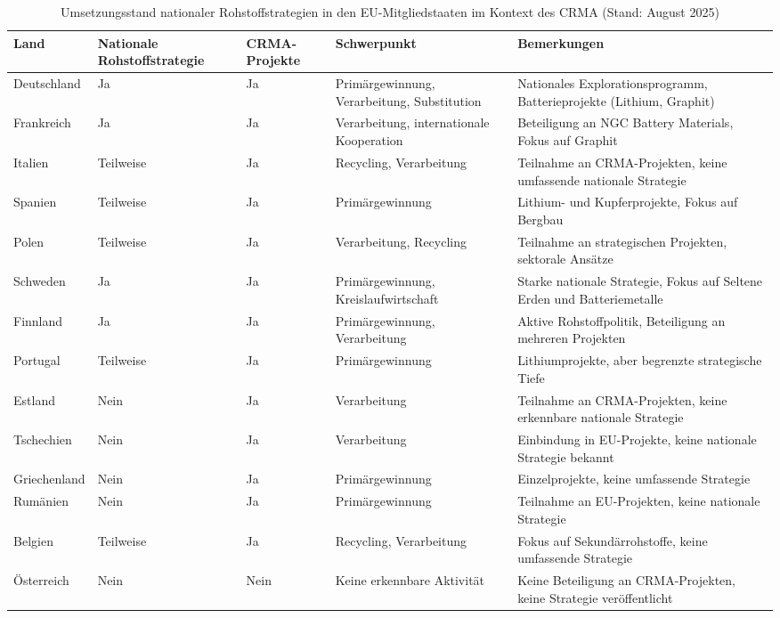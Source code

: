 \documentclass[12pt,a4paper,oneside]{book} %
\begin{document}
\begin{table}[htbp]
	\centering
	\caption{Umsetzungsstand nationaler Rohstoffstrategien in den EU-Mitgliedstaaten im Kontext des CRMA (Stand: August 2025)}
	\begin{tabular}{|p{3cm}|p{2.5cm}|p{2.5cm}|p{4cm}|p{6cm}|}
		\hline
		\textbf{Land} & \textbf{Nationale Rohstoffstrategie} & \textbf{CRMA-Projekte} & \textbf{Schwerpunkt} & \textbf{Bemerkungen} \\
		\hline
		Deutschland & Ja & Ja & Primärgewinnung, Verarbeitung, Substitution & Nationales Explorationsprogramm, Batterieprojekte (Lithium, Graphit) \\
		Frankreich & Ja & Ja & Verarbeitung, internationale Kooperation & Beteiligung an NGC Battery Materials, Fokus auf Graphit \\
		Italien & Teilweise & Ja & Recycling, Verarbeitung & Teilnahme an CRMA-Projekten, keine umfassende nationale Strategie \\
		Spanien & Teilweise & Ja & Primärgewinnung & Lithium- und Kupferprojekte, Fokus auf Bergbau \\
		Polen & Teilweise & Ja & Verarbeitung, Recycling & Teilnahme an strategischen Projekten, sektorale Ansätze \\
		Schweden & Ja & Ja & Primärgewinnung, Kreislaufwirtschaft & Starke nationale Strategie, Fokus auf Seltene Erden und Batteriemetalle \\
		Finnland & Ja & Ja & Primärgewinnung, Verarbeitung & Aktive Rohstoffpolitik, Beteiligung an mehreren Projekten \\
		Portugal & Teilweise & Ja & Primärgewinnung & Lithiumprojekte, aber begrenzte strategische Tiefe \\
		Estland & Nein & Ja & Verarbeitung & Teilnahme an CRMA-Projekten, keine erkennbare nationale Strategie \\
		Tschechien & Nein & Ja & Verarbeitung & Einbindung in EU-Projekte, keine nationale Strategie bekannt \\
		Griechenland & Nein & Ja & Primärgewinnung & Einzelprojekte, keine umfassende Strategie \\
		Rumänien & Nein & Ja & Primärgewinnung & Teilnahme an EU-Projekten, keine nationale Strategie \\
		Belgien & Teilweise & Ja & Recycling, Verarbeitung & Fokus auf Sekundärrohstoffe, keine umfassende Strategie \\
		Österreich & Nein & Nein & Keine erkennbare Aktivität & Keine Beteiligung an CRMA-Projekten, keine Strategie veröffentlicht \\

\end{tabular}
\end{table}
\end{document}
